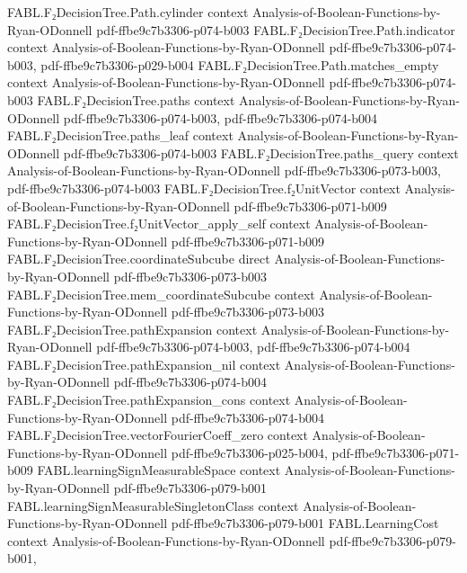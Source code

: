 \begin{theorem}
\proofstep
  {FABL.F₂DecisionTree.Path.cylinder}
  {context}
  {Analysis-of-Boolean-Functions-by-Ryan-ODonnell}
  {pdf-ffbe9c7b3306-p074-b003}
\proofstep
  {FABL.F₂DecisionTree.Path.indicator}
  {context}
  {Analysis-of-Boolean-Functions-by-Ryan-ODonnell}
  {pdf-ffbe9c7b3306-p074-b003,
    pdf-ffbe9c7b3306-p029-b004}
\proofstep
  {FABL.F₂DecisionTree.Path.matches_empty}
  {context}
  {Analysis-of-Boolean-Functions-by-Ryan-ODonnell}
  {pdf-ffbe9c7b3306-p074-b003}
\proofstep
  {FABL.F₂DecisionTree.paths}
  {context}
  {Analysis-of-Boolean-Functions-by-Ryan-ODonnell}
  {pdf-ffbe9c7b3306-p074-b003,
    pdf-ffbe9c7b3306-p074-b004}
\proofstep
  {FABL.F₂DecisionTree.paths_leaf}
  {context}
  {Analysis-of-Boolean-Functions-by-Ryan-ODonnell}
  {pdf-ffbe9c7b3306-p074-b003}
\proofstep
  {FABL.F₂DecisionTree.paths_query}
  {context}
  {Analysis-of-Boolean-Functions-by-Ryan-ODonnell}
  {pdf-ffbe9c7b3306-p073-b003,
    pdf-ffbe9c7b3306-p074-b003}
\proofstep
  {FABL.F₂DecisionTree.f₂UnitVector}
  {context}
  {Analysis-of-Boolean-Functions-by-Ryan-ODonnell}
  {pdf-ffbe9c7b3306-p071-b009}
\proofstep
  {FABL.F₂DecisionTree.f₂UnitVector_apply_self}
  {context}
  {Analysis-of-Boolean-Functions-by-Ryan-ODonnell}
  {pdf-ffbe9c7b3306-p071-b009}
\proofstep
  {FABL.F₂DecisionTree.coordinateSubcube}
  {direct}
  {Analysis-of-Boolean-Functions-by-Ryan-ODonnell}
  {pdf-ffbe9c7b3306-p073-b003}
\proofstep
  {FABL.F₂DecisionTree.mem_coordinateSubcube}
  {context}
  {Analysis-of-Boolean-Functions-by-Ryan-ODonnell}
  {pdf-ffbe9c7b3306-p073-b003}
\proofstep
  {FABL.F₂DecisionTree.pathExpansion}
  {context}
  {Analysis-of-Boolean-Functions-by-Ryan-ODonnell}
  {pdf-ffbe9c7b3306-p074-b003,
    pdf-ffbe9c7b3306-p074-b004}
\proofstep
  {FABL.F₂DecisionTree.pathExpansion_nil}
  {context}
  {Analysis-of-Boolean-Functions-by-Ryan-ODonnell}
  {pdf-ffbe9c7b3306-p074-b004}
\proofstep
  {FABL.F₂DecisionTree.pathExpansion_cons}
  {context}
  {Analysis-of-Boolean-Functions-by-Ryan-ODonnell}
  {pdf-ffbe9c7b3306-p074-b004}
\proofstep
  {FABL.F₂DecisionTree.vectorFourierCoeff_zero}
  {context}
  {Analysis-of-Boolean-Functions-by-Ryan-ODonnell}
  {pdf-ffbe9c7b3306-p025-b004,
    pdf-ffbe9c7b3306-p071-b009}
\proofstep
  {FABL.learningSignMeasurableSpace}
  {context}
  {Analysis-of-Boolean-Functions-by-Ryan-ODonnell}
  {pdf-ffbe9c7b3306-p079-b001}
\proofstep
  {FABL.learningSignMeasurableSingletonClass}
  {context}
  {Analysis-of-Boolean-Functions-by-Ryan-ODonnell}
  {pdf-ffbe9c7b3306-p079-b001}
\proofstep
  {FABL.LearningCost}
  {context}
  {Analysis-of-Boolean-Functions-by-Ryan-ODonnell}
  {pdf-ffbe9c7b3306-p079-b001,
}
\end{theorem}
